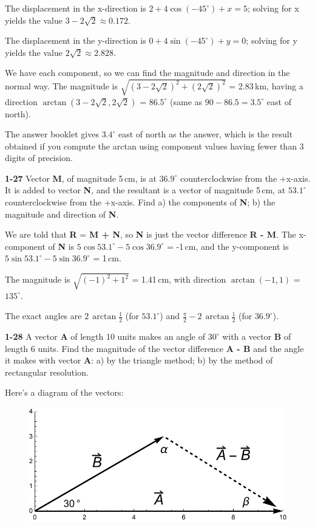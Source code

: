 \documentclass{amsart}
\begin{document}
The displacement in the x-direction is $2 + 4 \cos (-45^\circ) + x = 5$;
solving for x yields the value $3 - 2\sqrt{2} \approx 0.172$.

The displacement in the y-direction is $0 + 4 \sin (-45^\circ) + y = 0$;
solving for y yields the value $2 \sqrt{2} \approx 2.828$.

We have each component, so we can find the magnitude and direction in the normal way.
The magnitude is $\sqrt{(3 - 2\sqrt{2})^2 + (2\sqrt{2})^2}$ = 2.83\,km,
having a direction $\arctan (3-2\sqrt{2}, 2\sqrt{2})$ = $86.5^\circ$
(same as $90 - 86.5 = 3.5^\circ$ east of north).

The answer booklet gives $3.4^\circ$ east of north as the answer,
which is the result obtained if you compute the arctan using component values having fewer than 3 digits of precision.

\textbf{1-27} Vector \textbf{M}, of magnitude 5\,cm, is at $36.9^\circ$ counterclockwise from the +x-axis.
It is added to vector \textbf{N}, and the resultant is a vector of magnitude 5\,cm, at $53.1^\circ$ counterclockwise from the +x-axis.
Find\newline
a) the components of \textbf{N};\newline
b) the magnitude and direction of \textbf{N}.

We are told that \textbf{R} = \textbf{M + N}, so \textbf{N} is just the vector difference \textbf{R - M}.
The x-component of \textbf{N} is $5 \cos 53.1^\circ - 5 \cos 36.9^\circ$ = -1\,cm,
and the y-component is $5 \sin 53.1^\circ - 5 \sin 36.9^\circ$ = 1\,cm.

The magnitude is $\sqrt{(-1)^2 + 1^2}$ = 1.41\,cm, with direction $\arctan(-1,1)$ = $135^\circ$.

The exact angles are $2\,\arctan \frac{1}{2}$ (for $53.1^\circ$)
and $\frac{\pi}{2} - 2\,\arctan \frac{1}{2}$ (for $36.9^\circ$).

\textbf{1-28} A vector \textbf{A} of length 10 units makes an angle of $30^\circ$ with a vector \textbf{B}
of length 6 units.
Find the magnitude of the vector difference \textbf{A - B} and the angle it makes with vector \textbf{A}:\newline
a) by the triangle method;\newline
b) by the method of rectangular resolution.

Here's a diagram of the vectors:

\begin{figure}[h]
\includegraphics[scale=0.32]{1-28}
\end{figure}
\end{document}

